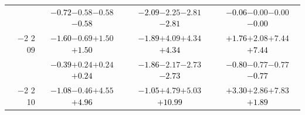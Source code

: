 \documentclass[compress]{beamer}
\begin{document}
\begin{frame}
\begin{tabular}{r | c | c | c}
          & \textcolor{black}{$-0.72$}\hspace{0.1 cm}$-0.58$\hspace{0.1 cm}$-0.58$\hspace{0.1 cm}\textcolor{black}{$-0.58$} & \textcolor{black}{$-2.09$}\hspace{0.1 cm}$-2.25$\hspace{0.1 cm}$-2.81$\hspace{0.1 cm}\textcolor{black}{$-2.81$} & \textcolor{black}{$-0.06$}\hspace{0.1 cm}$-0.00$\hspace{0.1 cm}$-0.00$\hspace{0.1 cm}\textcolor{black}{$-0.00$} \\
$-$2 2 09 & \textcolor{black}{$-1.60$}\hspace{0.1 cm}$-0.69$\hspace{0.1 cm}$+1.50$\hspace{0.1 cm}\textcolor{black}{$+1.50$} & \textcolor{black}{$-1.89$}\hspace{0.1 cm}$+4.09$\hspace{0.1 cm}$+4.34$\hspace{0.1 cm}\textcolor{black}{$+4.34$} & \textcolor{black}{$+1.76$}\hspace{0.1 cm}$+2.08$\hspace{0.1 cm}$+7.44$\hspace{0.1 cm}\textcolor{black}{$+7.44$} \\
          & \textcolor{black}{$-0.39$}\hspace{0.1 cm}$+0.24$\hspace{0.1 cm}$+0.24$\hspace{0.1 cm}\textcolor{black}{$+0.24$} & \textcolor{black}{$-1.86$}\hspace{0.1 cm}$-2.17$\hspace{0.1 cm}$-2.73$\hspace{0.1 cm}\textcolor{black}{$-2.73$} & \textcolor{black}{$-0.80$}\hspace{0.1 cm}$-0.77$\hspace{0.1 cm}$-0.77$\hspace{0.1 cm}\textcolor{black}{$-0.77$} \\
$-$2 2 10 & \textcolor{black}{$-1.08$}\hspace{0.1 cm}$-0.46$\hspace{0.1 cm}$+4.55$\hspace{0.1 cm}\textcolor{black}{$+4.96$} & \textcolor{black}{$-1.05$}\hspace{0.1 cm}$+4.79$\hspace{0.1 cm}$+5.03$\hspace{0.1 cm}\textcolor{black}{$+10.99$} & \textcolor{black}{$+3.30$}\hspace{0.1 cm}$+2.86$\hspace{0.1 cm}$+7.83$\hspace{0.1 cm}\textcolor{black}{$+1.89$} \\

\end{tabular}
\end{frame}
\end{document}
